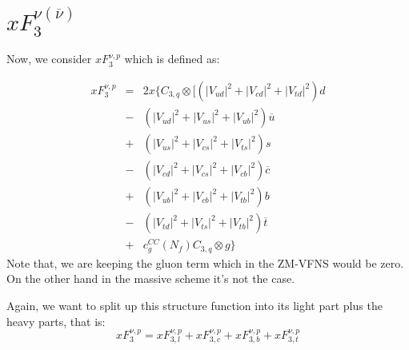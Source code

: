 \documentclass[10pt,a4paper]{article}
\begin{document}
\section{$xF_3^{\nu(\overline{\nu})}$}

Now, we consider $xF_3^{\nu,p}$ which is defined as:

\begin{equation}\label{f3nup}
\begin{array}{rcl}
xF_3^{\nu,p} &=& 2x\Big\{ C_{3,q}\otimes\Big[\left(|V_{ud}|^2+|V_{cd}|^2+|V_{td}|^2\right)d\\
            &-& \left(|V_{ud}|^2+|V_{us}|^2+|V_{ub}|^2\right)\overline{u}\\
            &+& \left(|V_{us}|^2+|V_{cs}|^2+|V_{ts}|^2\right)s\\
            &-& \left(|V_{cd}|^2+|V_{cs}|^2+|V_{cb}|^2\right)\overline{c}\\
            &+& \left(|V_{ub}|^2+|V_{cb}|^2+|V_{tb}|^2\right)b\\
            &-& \left(|V_{td}|^2+|V_{ts}|^2+|V_{tb}|^2\right)\overline{t}\\
            &+& c^{CC}_g(N_f)C_{3,q}\otimes g\Big\}
\end{array}
\end{equation}
Note that, we are keeping the gluon term which in the ZM-VFNS would be zero. On the other hand in the massive scheme it's not the case.

Again, we want to split up this structure function into its light part
plus the heavy parts, that is:
\begin{equation}
xF_3^{\nu,p} = xF_{3,l}^{\nu,p} + xF_{3,c}^{\nu,p} + xF_{3,b}^{\nu,p} + xF_{3,t}^{\nu,p}
\end{equation}
\end{document}
